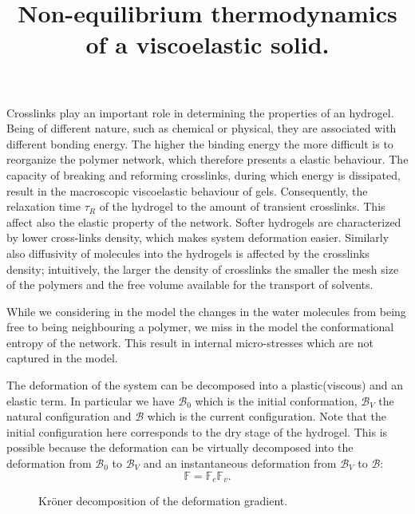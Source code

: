\documentclass[12pt]{extarticle}
\title{Non-equilibrium thermodynamics of a viscoelastic solid.}
\author{}
\newcommand{\F}{\ensuremath{\mathbb{F}}}
\begin{document}
\maketitle
Crosslinks play an important role in determining the properties of an hydrogel. Being of different nature, such as chemical or physical, they are associated with different bonding energy. The higher the binding energy the more difficult is to reorganize the polymer network, which therefore presents a elastic behaviour. The capacity of breaking and reforming crosslinks, during which energy is dissipated, result in the macroscopic viscoelastic behaviour of gels. Consequently, the relaxation time $\tau_R$ of the hydrogel to the amount of transient crosslinks. This affect also the elastic property of the network. Softer hydrogels are characterized by lower cross-links density, which makes system deformation easier. Similarly also diffusivity of molecules into the hydrogels is affected by the crosslinks density; intuitively, the larger the density of crosslinks the smaller the mesh size of the polymers and the free volume available for the transport of solvents. 

While we considering in the model the changes in the water molecules from being free to being neighbouring a polymer, we miss in the model the conformational entropy of the network. This result in internal micro-stresses which are not captured in the model.  

\newpage

The deformation of the system can be decomposed into a plastic(viscous) and an elastic term. In particular we have $\mathcal{B}_0$ which is the initial conformation, $\mathcal{B}_V$ the natural configuration and $\mathcal{B}$ which is the current configuration. Note that the initial configuration here corresponds to the dry stage of the hydrogel. This is possible because the deformation can be virtually decomposed into the deformation from $\mathcal{B}_0$ to $\mathcal{B}_V$ and an instantaneous deformation from $\mathcal{B}_V$ to $\mathcal{B}$:
\begin{equation}
    \F=\F_e\F_v.
\end{equation}

\begin{figure}[h!]
	\begin{subfigure}{0.48\textwidth}
		\centering
		\def\svgwidth{1\linewidth}
		
		\caption{}
		\label{fig1}
	\end{subfigure}
\hspace{5mm}
	\begin{subfigure}{0.48\textwidth}
	\centering
	\def\svgwidth{1.2\linewidth}
	
	\caption{}
	\end{subfigure}	
\caption{Kr\"{o}ner decomposition of the deformation gradient.}
\end{figure}
\end{document}
